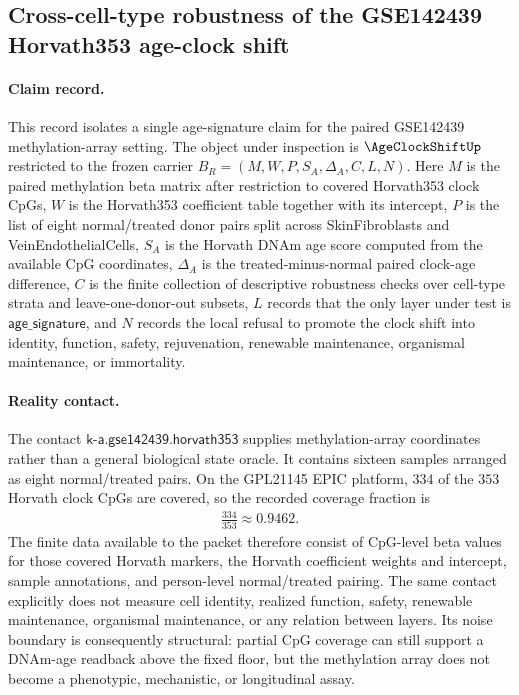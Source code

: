 \subsection{Cross-cell-type robustness of the GSE142439 Horvath353 age-clock shift}
\label{sec:age-clock-shift-gse142439-cross-cell-type-robustness}

\paragraph{Claim record.}
This record isolates a single age-signature claim for the paired GSE142439 methylation-array setting. The object under inspection is $\AgeClockShiftUp$ restricted to the frozen carrier
$B_R=(M,W,P,S_A,\Delta_A,C,L,N)$. Here $M$ is the paired methylation beta matrix after restriction to covered Horvath353 clock CpGs, $W$ is the Horvath353 coefficient table together with its intercept, $P$ is the list of eight normal/treated donor pairs split across SkinFibroblasts and VeinEndothelialCells, $S_A$ is the Horvath DNAm age score computed from the available CpG coordinates, $\Delta_A$ is the treated-minus-normal paired clock-age difference, $C$ is the finite collection of descriptive robustness checks over cell-type strata and leave-one-donor-out subsets, $L$ records that the only layer under test is $\mathsf{age\_signature}$, and $N$ records the local refusal to promote the clock shift into identity, function, safety, rejuvenation, renewable maintenance, organismal maintenance, or immortality.

\paragraph{Reality contact.}
The contact $\mathsf{k\mbox{-}a.gse142439.horvath353}$ supplies methylation-array coordinates rather than a general biological state oracle. It contains sixteen samples arranged as eight normal/treated pairs. On the GPL21145 EPIC platform, $334$ of the $353$ Horvath clock CpGs are covered, so the recorded coverage fraction is
$$
\begin{aligned}
\frac{334}{353} \approx 0.9462.
\end{aligned}
$$
The finite data available to the packet therefore consist of CpG-level beta values for those covered Horvath markers, the Horvath coefficient weights and intercept, sample annotations, and person-level normal/treated pairing. The same contact explicitly does not measure cell identity, realized function, safety, renewable maintenance, organismal maintenance, or any relation between layers. Its noise boundary is consequently structural: partial CpG coverage can still support a DNAm-age readback above the fixed floor, but the methylation array does not become a phenotypic, mechanistic, or longitudinal assay.

